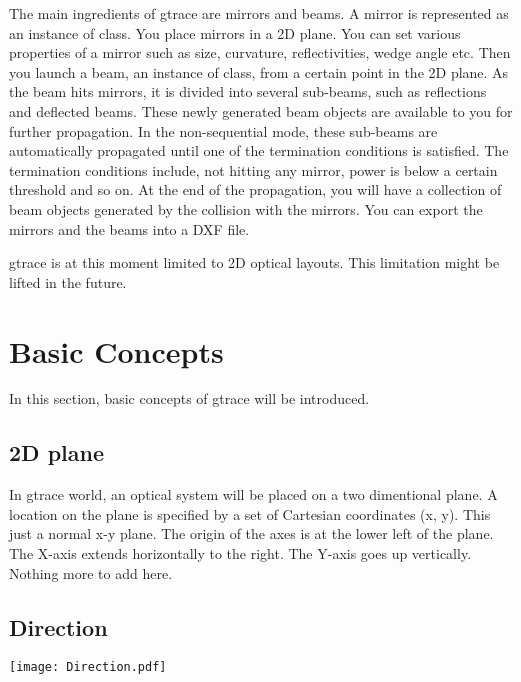 \documentclass[letterpaper,10pt,english]{sphinxmanual}
\begin{document}
The main ingredients of gtrace are mirrors and beams. A mirror is represented as an instance of {\hyperref[api/gtrace:gtrace.optcomp.Mirror]{}} class. You place mirrors in a 2D plane. You can set various properties of a mirror such as size, curvature, reflectivities, wedge angle etc. Then you launch a beam, an instance of {\hyperref[api/gtrace:gtrace.beam.GaussianBeam]{}} class, from a certain point in the 2D plane. As the beam hits mirrors, it is divided into several sub-beams, such as reflections and deflected beams. These newly generated beam objects are available to you for further propagation. In the non-sequential mode, these sub-beams are automatically propagated until one of the termination conditions is satisfied. The termination conditions include, not hitting any mirror, power is below a certain threshold and so on. At the end of the propagation, you will have a collection of beam objects generated by the collision with the mirrors. You can export the mirrors and the beams into a DXF file.

gtrace is at this moment limited to 2D optical layouts. This limitation might be lifted in the future.


\chapter{Basic Concepts}
\label{basic_concepts:basic-concepts}\label{basic_concepts::doc}
In this section, basic concepts of gtrace will be introduced.


\section{2D plane}
\label{basic_concepts:d-plane}
In gtrace world, an optical system will be placed on a two dimentional plane. A location on the plane is specified by a set of Cartesian coordinates (x, y). This just a normal x-y plane. The origin of the axes is at the lower left of the plane. The X-axis extends horizontally to the right. The Y-axis goes up vertically. Nothing more to add here.


\section{Direction}
\label{basic_concepts:direction}
\texttt{[image: Direction.pdf]}
\end{document}
